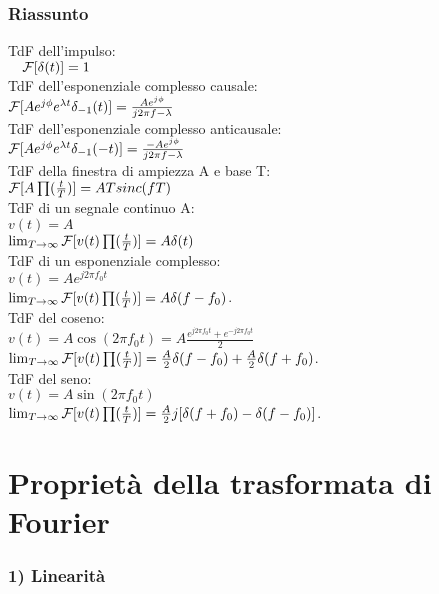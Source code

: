 	\subsubsection{Riassunto}
	
	TdF dell'impulso:\\
	$ \quad \mathcal{F} [ \delta(t) ] = 1 $\\
	TdF dell'esponenziale complesso causale:\\
	$ \mathcal{F} [  A e^{ j \phi} e^{ \lambda t} \delta_{-1}(t) ] = \frac{A e^{j \phi}}{j2 \pi f - \lambda} $\\
	TdF dell'esponenziale complesso anticausale:\\
	$ \mathcal{F} [ A e^{ j \phi} e^{ \lambda t} \delta_{-1}(-t) ] =  \frac{ -Ae^{j \phi}}{j2 \pi f-\lambda} $\\
	TdF della finestra di ampiezza A e base T:\\
	$ \mathcal{F} [  A \prod (\frac{t}{T}) ] = AT sinc(f T) $\\
	TdF di un segnale continuo A:\\
	$ v(t) = A $\\
	$ \lim_{T \to \infty} \mathcal{F} [  v(t) \prod (\frac{t}{T}) ] = A \delta(t) $\\
	TdF di un esponenziale complesso:\\
	$ v(t) = A e^{j2\pi f_0 t}$\\
	$ \lim_{T \to \infty} \mathcal{F} [  v(t) \prod (\frac{t}{T}) ] = A \delta (f-f_0)$.\\
	TdF del coseno:\\
	$ v(t) = A \cos (2 \pi f_0 t) = A \frac{e^{j 2 \pi f_0 t} + e^{-j 2 \pi f_0 t}}{ 2}$\\
	$ \lim_{T \to \infty} \mathcal{F} [  v(t) \prod (\frac{t}{T}) ] = \frac{A}{2} \delta (f-f_0) + \frac{A}{2} \delta (f+f_0)$.\\
	TdF del seno:\\
	$ v(t) = A \sin (2 \pi f_0 t)$\\
	$ \lim_{T \to \infty} \mathcal{F} [  v(t) \prod (\frac{t}{T}) ] = \frac{A}{2}j[ \delta (f+f_0) - \delta (f-f_0) ]$.\\

\section{ Proprietà della trasformata di Fourier }

	\subsubsection{1) Linearità}
	

